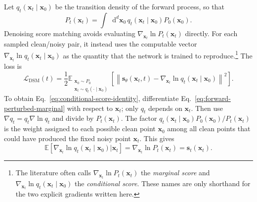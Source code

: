 \documentclass[11pt]{article}
\newcommand{\vct}[1]{\bm{#1}}
\newcommand{\dd}{\mathop{}\!\mathrm{d}}
\begin{document}
Let \(q_t(\vct{x}_t\mid\vct{x}_0)\) be the transition density of the forward
process, so that
\begin{equation}
    P_t(\vct{x}_t)=\int\dd^d\vct{x}_0\,
    q_t(\vct{x}_t\mid\vct{x}_0)P_0(\vct{x}_0).
    \label{eq:forward-perturbed-marginal}
\end{equation}
Denoising score matching avoids evaluating
\(\nabla_{\vct{x}_t}\ln P_t(\vct{x}_t)\) directly. For each sampled clean/noisy
pair, it instead uses the computable vector
\(\nabla_{\vct{x}_t}\ln q_t(\vct{x}_t\mid\vct{x}_0)\) as the quantity that the
network is trained to reproduce.\footnote{The literature often calls
\(\nabla_{\vct{x}_t}\ln P_t(\vct{x}_t)\) the \emph{marginal score} and
\(\nabla_{\vct{x}_t}\ln q_t(\vct{x}_t\mid\vct{x}_0)\) the
\emph{conditional score}. These names are only shorthand for the two explicit
gradients written here.} The loss is
\begin{equation}
    \mathcal{L}_{\mathrm{DSM}}(t)
    =\frac{1}{2}\mathbb{E}_{\substack{\vct{x}_0\sim P_0\\
                           \vct{x}_t\sim q_t(\cdot\mid\vct{x}_0)}}
      \!\left[\left\lVert
      \vct{s}_{\theta}(\vct{x}_t,t)
      -\nabla_{\vct{x}_t}\ln q_t(\vct{x}_t\mid\vct{x}_0)
      \right\rVert^2\right].
    \label{eq:denoising-score-matching}
\end{equation}
To obtain Eq.~\eqref{eq:conditional-score-identity}, differentiate
Eq.~\eqref{eq:forward-perturbed-marginal} with respect to \(\vct{x}_t\);
only \(q_t\) depends on \(\vct{x}_t\). Then use
\(\nabla q_t=q_t\nabla\ln q_t\) and divide by \(P_t(\vct{x}_t)\). The
factor \(q_t(\vct{x}_t\mid\vct{x}_0)P_0(\vct{x}_0)/P_t(\vct{x}_t)\)
is the weight assigned to each possible clean point \(\vct{x}_0\) among all
clean points that could have produced the fixed noisy point \(\vct{x}_t\).
This gives
\begin{equation}
    \mathbb{E}\!\left[
      \nabla_{\vct{x}_t}\ln q_t(\vct{x}_t\mid\vct{x}_0)
      \mathrel{\big|}\vct{x}_t\right]
    =\nabla_{\vct{x}_t}\ln P_t(\vct{x}_t)
    =\vct{s}_t(\vct{x}_t).
    \label{eq:conditional-score-identity}
\end{equation}
\end{document}
